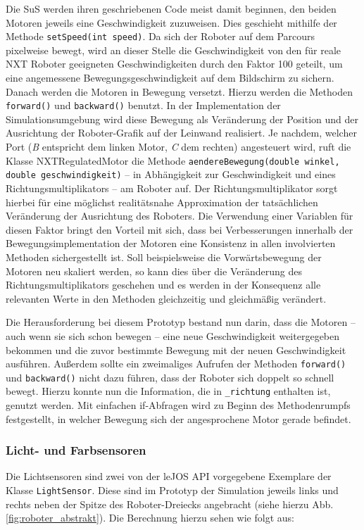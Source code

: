 \documentclass[paper=a4, DIV=calc, BCOR=12mm, twoside=on, onecolumn=on, open = right, titlepage =on, parskip =half-, headsepline = on, footsepline = off, chapterprefix = off, appendixprefix = on, fontsize = 12pt, numbers = noenddot, abstract = on]{scrbook}
\begin{document}
Die SuS werden ihren geschriebenen Code meist damit beginnen, den beiden Motoren jeweils eine Geschwindigkeit zuzuweisen. Dies geschieht mithilfe der Methode \texttt{setSpeed(int speed)}. Da sich der Roboter auf dem Parcours pixelweise bewegt, wird an dieser Stelle die Geschwindigkeit von den für reale NXT Roboter geeigneten Geschwindigkeiten durch den Faktor 100 geteilt, um eine angemessene Bewegungsgeschwindigkeit auf dem Bildschirm zu sichern.\\
Danach werden die Motoren in Bewegung versetzt. Hierzu werden die Methoden \texttt{forward()} und \texttt{backward()} benutzt. In der Implementation der Simulationsumgebung wird diese Bewegung als Veränderung der Position und der Ausrichtung der Roboter-Grafik auf der Leinwand realisiert. Je nachdem, welcher Port (\emph{B} entspricht dem linken Motor, \emph{C} dem rechten) angesteuert wird, ruft die Klasse NXTRegulatedMotor die Methode \texttt{aendereBewegung(double winkel, double geschwindigkeit)} -- in Abhängigkeit zur Geschwindigkeit und eines Richtungsmultiplikators -- am Roboter auf. Der Richtungsmultiplikator sorgt hierbei für eine möglichst realitätsnahe Approximation der tatsächlichen Veränderung der Ausrichtung des Roboters. Die Verwendung einer Variablen für diesen Faktor bringt den Vorteil mit sich, dass bei Verbesserungen innerhalb der Bewegungsimplementation der Motoren eine Konsistenz in allen involvierten Methoden sichergestellt ist. Soll beispielsweise die Vorwärtsbewegung der Motoren neu skaliert werden, so kann dies über die Veränderung des Richtungsmultiplikators geschehen und es werden in der Konsequenz alle relevanten Werte in den Methoden gleichzeitig und gleichmäßig verändert. 

Die Herausforderung bei diesem Prototyp bestand nun darin, dass die Motoren -- auch wenn sie sich schon bewegen -- eine neue Geschwindigkeit weitergegeben bekommen und die zuvor bestimmte Bewegung mit der neuen Geschwindigkeit ausführen. Außerdem sollte ein zweimaliges Aufrufen der Methoden \texttt{forward()} und \texttt{backward()} nicht dazu führen, dass der Roboter sich doppelt so schnell bewegt. Hierzu konnte nun die Information, die in  \texttt{{\_}richtung} enthalten ist, genutzt werden. Mit einfachen if-Abfragen wird zu Beginn des Methodenrumpfs festgestellt, in welcher Bewegung sich der angesprochene Motor gerade befindet. 


\subsubsection{Licht- und Farbsensoren}
Die Lichtsensoren sind zwei von der leJOS API vorgegebene Exemplare der Klasse \texttt{LightSensor}. Diese sind im Prototyp der Simulation jeweils links und rechts neben der Spitze des Roboter-Dreiecks angebracht (siehe hierzu Abb. \ref{fig:roboter_abstrakt}). Die Berechnung hierzu sehen wie folgt aus:
\end{document}
